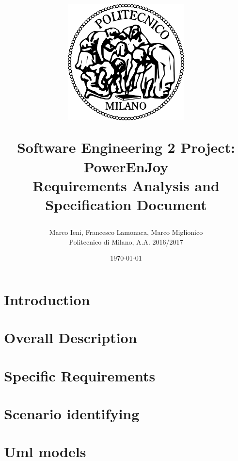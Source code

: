 \documentclass[a4paper, 12pt]{report}
\title{
	\begin{figure}[h]
		\centering
		\includegraphics{../common_resources/logo_polimi.png}
	\end{figure}
	\vspace{30px}
	Software Engineering 2 Project: PowerEnJoy \\ \vspace{1em}
	\textbf{R}equirements \textbf{A}nalysis and \textbf{S}pecification \textbf{D}ocument
}
\author{Marco Ieni, Francesco Lamonaca, Marco Miglionico\\Politecnico di Milano, A.A. 2016/2017}
\date{\today}
\begin{document}
\maketitle
\tableofcontents

\chapter{Introduction}
\label{ch:introduction}












\chapter{Overall Description}
\label{ch:overall_description}







\chapter{Specific Requirements}
\label{ch:specific_requirements}


% 


\chapter{Scenario identifying}


\chapter{Uml models}



\end{document}
